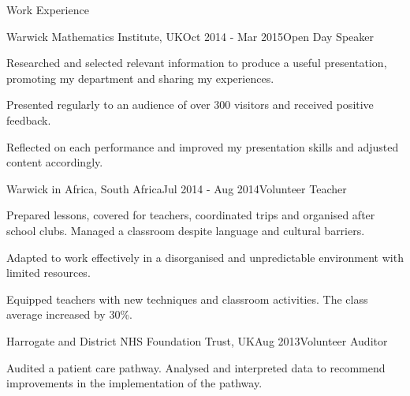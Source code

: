 \documentclass{resume} %
\begin{document}
\begin{rSection}{Work Experience}

\begin{rSubsection}{Warwick Mathematics Institute, UK}{Oct 2014 - Mar 2015}{Open Day Speaker}{}
\item Researched and selected  relevant information to produce a useful presentation, promoting my department and sharing my experiences. 
\item Presented regularly to an audience of over 300 visitors and received positive feedback. 
\item Reflected on each performance and improved my presentation skills and adjusted content accordingly.
\end{rSubsection}

\begin{rSubsection}{Warwick in Africa, South Africa}{Jul 2014 - Aug 2014}{Volunteer Teacher}{}
\item Prepared lessons, covered for teachers, coordinated trips and organised after school clubs. Managed a classroom despite language and cultural barriers.
\item Adapted to work effectively in a disorganised and unpredictable environment with limited resources.
\item Equipped teachers with new techniques and classroom activities. The class average increased by 30\%.  
\end{rSubsection}



\begin{rSubsection}{Harrogate and District NHS Foundation Trust, UK}{Aug 2013}{Volunteer Auditor}{}
\item Audited a patient care pathway. Analysed and interpreted data to recommend improvements in the implementation of the pathway. 
\end{rSubsection}

\iffalse

\begin{rSubsection}{CCF Accountancy, UK}{Aug 2012 - Sep 2012}{Assistant Accountant}{}
\item Carried out basic accounting and bookkeeping. Covered the front desk, directly interacting with clients.
\item Communicated with clients to obtain necessary information. Gained experience with SAGE and Excel. 
\end{rSubsection}

\fi



\end{rSection}
\end{document}
